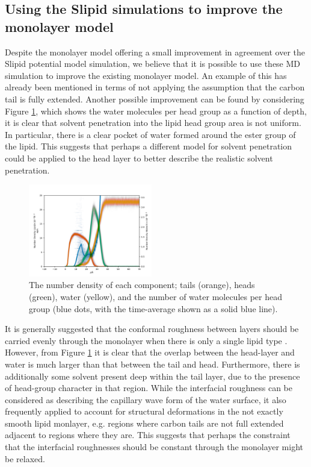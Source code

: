 \documentclass[amsmath,amssymb,twocolumn,superscriptaddress,aps,prl]{revtex4-1}
\begin{document}
\subsection{Using the Slipid simulations to improve the monolayer model}
Despite the monolayer model offering a small improvement in agreement over the Slipid potential model simulation, we believe that it is possible to use these MD simulation to improve the existing monolayer model.
An example of this has already been mentioned in terms of not applying the assumption that the carbon tail is fully extended.
Another possible improvement can be found by considering Figure \ref{fig:nb}, which shows the water molecules per head group as a function of depth, it is clear that solvent penetration into the lipid head group area is not uniform.
In particular, there is a clear pocket of water formed around the ester group of the lipid.
This suggests that perhaps a different model for solvent penetration could be applied to the head layer to better describe the realistic solvent penetration.
%
\begin{figure}
\centering
  \includegraphics[width=0.48\textwidth]{figures/number_density}
  \caption{The number density of each component; tails (orange), heads (green), water (yellow), and the number of water molecules per head group (blue dots, with the time-average shown as a solid blue line).}
  \label{fig:nb}
\end{figure}
%

It is generally suggested that the conformal roughness between layers should be carried evenly through the monolayer when there is only a single lipid type \cite{Campbell2018}.
However, from Figure \ref{fig:nb} it is clear that the overlap between the head-layer and water is much larger than that between the tail and head.
Furthermore, there is additionally some solvent present deep within the tail layer, due to the presence of head-group character in that region.
While the interfacial roughness can be considered as describing the capillary wave form of the water surface, it also frequently applied to account for structural deformations in the not exactly smooth lipid monlayer, e.g. regions where carbon tails are not full extended adjacent to regions where they are.
This suggests that perhaps the constraint that the interfacial roughnesses should be constant through the monolayer might be relaxed.
\end{document}
